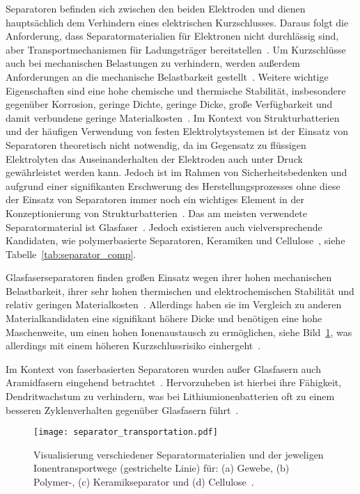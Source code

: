 Separatoren befinden sich zwischen den beiden Elektroden und dienen hauptsächlich dem Verhindern eines elektrischen Kurzschlusses. Daraus folgt die Anforderung, dass Separatormaterialien für Elektronen nicht durchlässig sind, aber Transportmechanismen für Ladungsträger bereitstellen~\cite{Kurzweil2015}. Um Kurzschlüsse auch bei mechanischen Belastungen zu verhindern, werden außerdem Anforderungen an die mechanische Belastbarkeit gestellt~\cite{Asp2015}. Weitere wichtige Eigenschaften sind eine hohe chemische und thermische Stabilität, insbesondere gegenüber Korrosion, geringe Dichte, geringe Dicke, große Verfügbarkeit und damit verbundene geringe Materialkosten~\cite{Beard2019}. Im Kontext von Strukturbatterien und der häufigen Verwendung von festen Elektrolytsystemen ist der Einsatz von Separatoren theoretisch nicht notwendig, da im Gegensatz zu flüssigen Elektrolyten das Auseinanderhalten der Elektroden auch unter Druck gewährleistet werden kann. Jedoch ist im Rahmen von Sicherheitsbedenken und aufgrund einer signifikanten Erschwerung des Herstellungsprozesses ohne diese der Einsatz von Separatoren immer noch ein wichtiges Element in der Konzeptionierung von Strukturbatterien~\cite{Asp2015, Hubert2022}. Das am meisten verwendete Separatormaterial ist Glasfaser~\cite{Zhou2022}. Jedoch existieren auch vielversprechende Kandidaten, wie polymerbasierte Separatoren, Keramiken und Cellulose~\cite{Simon2008, Greenhalgh2023}, siehe Tabelle~\ref{tab:separator_comp}.



Glasfaserseparatoren finden großen Einsatz wegen ihrer hohen mechanischen Belastbarkeit, ihrer sehr hohen thermischen und elektrochemischen Stabilität und relativ geringen Materialkosten~\cite{Luo2015,Asp2019,Asp2021,Liu2022}. Allerdings haben sie im Vergleich zu anderen Materialkandidaten eine signifikant höhere Dicke und benötigen eine hohe Maschenweite, um einen hohen Ionenaustausch zu ermöglichen, siehe Bild~\ref{fig:separator_transportation}, was allerdings mit einem höheren Kurzschlussrisiko einhergeht~\cite{Danzi2021,Zhou2022}. 

Im Kontext von faserbasierten Separatoren wurden außer Glasfasern auch Aramidfasern eingehend betrachtet~\cite{Jin2023}. Hervorzuheben ist hierbei ihre Fähigkeit, Dendritwachstum zu verhindern, was bei Lithiumionenbatterien oft zu einem besseren Zyklenverhalten gegenüber Glasfasern führt~\cite{Tung2015,Wang2021a}.

\begin{figure}[h]
        \center
	\texttt{[image: separator\_transportation.pdf]}
		\caption{\label{fig:separator_transportation}Visualisierung verschiedener Separatormaterialien und der jeweligen Ionentransportwege (gestrichelte Linie) für: (a) Gewebe, (b) Polymer-, (c) Keramikseparator und (d) Cellulose~\cite{Zschiebsch2024}.}
\end{figure}


